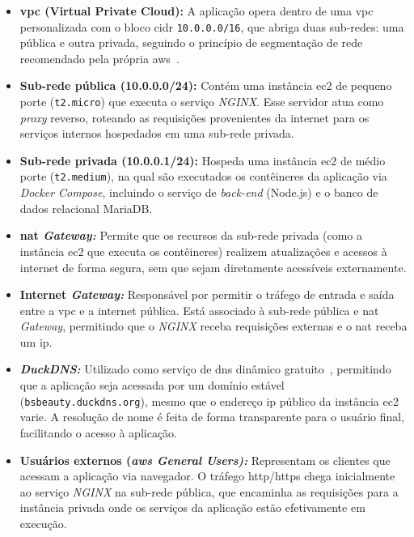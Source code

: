 \begin{itemize}
  \item \textbf{\gls{vpc} (Virtual Private Cloud):} A aplicação opera dentro de uma \gls{vpc} personalizada com o bloco \gls{cidr} \texttt{10.0.0.0/16}, que abriga duas sub-redes: uma pública e outra privada, seguindo o princípio de segmentação de rede recomendado pela própria \gls{aws}~\cite{AWSBestPractices}.

  \item \textbf{Sub-rede pública (10.0.0.0/24):} Contém uma instância \gls{ec2} de pequeno porte (\texttt{t2.micro}) que executa o serviço \emph{NGINX}. Esse servidor atua como \emph{proxy} reverso, roteando as requisições provenientes da internet para os serviços internos hospedados em uma sub-rede privada.

  \item \textbf{Sub-rede privada (10.0.0.1/24):} Hospeda uma instância \gls{ec2} de médio porte (\texttt{t2.medium}), na qual são executados os contêineres da aplicação via \emph{Docker Compose}, incluindo o serviço de \emph{back-end} (Node.js) e o banco de dados relacional MariaDB.

  \item \textbf{\gls{nat} \emph{Gateway:}} Permite que os recursos da sub-rede privada (como a instância \gls{ec2} que executa os contêineres) realizem atualizações e acessos à internet de forma segura, sem que sejam diretamente acessíveis externamente.

  \item \textbf{Internet \emph{Gateway:}} Responsável por permitir o tráfego de entrada e saída entre a \gls{vpc} e a internet pública. Está associado à sub-rede pública e \gls{nat} \emph{Gateway}, permitindo que o \emph{NGINX} receba requisições externas e o \gls{nat} receba um \gls{ip}.

  \item \textbf{\emph{DuckDNS:}} Utilizado como serviço de \gls{dns} dinâmico gratuito~\cite{DuckDNSDocs}, permitindo que a aplicação seja acessada por um domínio estável (\texttt{bsbeauty.duckdns.org}), mesmo que o endereço \gls{ip} público da instância \gls{ec2} varie. A resolução de nome é feita de forma transparente para o usuário final, facilitando o acesso à aplicação.

  \item \textbf{Usuários externos (\emph{\gls{aws} General Users):}} Representam os clientes que acessam a aplicação via navegador. O tráfego \gls{http}/\gls{https} chega inicialmente ao serviço \emph{NGINX} na sub-rede pública, que encaminha as requisições para a instância privada onde os serviços da aplicação estão efetivamente em execução.
\end{itemize}

